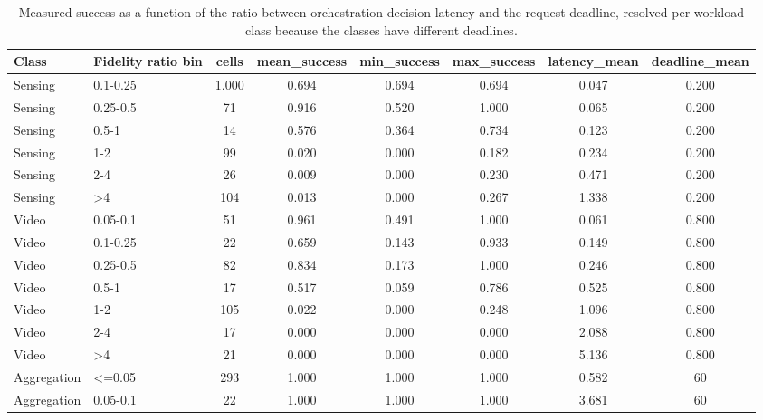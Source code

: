 \begin{table}
\centering
\scriptsize
\caption{Measured success as a function of the ratio between orchestration decision latency and the request deadline, resolved per workload class because the classes have different deadlines.}
\label{tab:p1-temporal-fidelity}
\begin{tabular}{llcccccc}
\toprule
Class & Fidelity ratio bin & cells & mean\_success & min\_success & max\_success & latency\_mean & deadline\_mean \\
\midrule
Sensing & 0.1-0.25 & 1.000 & 0.694 & 0.694 & 0.694 & 0.047 & 0.200 \\
Sensing & 0.25-0.5 & 71 & 0.916 & 0.520 & 1.000 & 0.065 & 0.200 \\
Sensing & 0.5-1 & 14 & 0.576 & 0.364 & 0.734 & 0.123 & 0.200 \\
Sensing & 1-2 & 99 & 0.020 & 0.000 & 0.182 & 0.234 & 0.200 \\
Sensing & 2-4 & 26 & 0.009 & 0.000 & 0.230 & 0.471 & 0.200 \\
Sensing & >4 & 104 & 0.013 & 0.000 & 0.267 & 1.338 & 0.200 \\
Video & 0.05-0.1 & 51 & 0.961 & 0.491 & 1.000 & 0.061 & 0.800 \\
Video & 0.1-0.25 & 22 & 0.659 & 0.143 & 0.933 & 0.149 & 0.800 \\
Video & 0.25-0.5 & 82 & 0.834 & 0.173 & 1.000 & 0.246 & 0.800 \\
Video & 0.5-1 & 17 & 0.517 & 0.059 & 0.786 & 0.525 & 0.800 \\
Video & 1-2 & 105 & 0.022 & 0.000 & 0.248 & 1.096 & 0.800 \\
Video & 2-4 & 17 & 0.000 & 0.000 & 0.000 & 2.088 & 0.800 \\
Video & >4 & 21 & 0.000 & 0.000 & 0.000 & 5.136 & 0.800 \\
Aggregation & <=0.05 & 293 & 1.000 & 1.000 & 1.000 & 0.582 & 60 \\
Aggregation & 0.05-0.1 & 22 & 1.000 & 1.000 & 1.000 & 3.681 & 60 \\
\bottomrule
\end{tabular}
\par\vspace{2pt}{\footnotesize\raggedright This is the calibration curve that replaces the D/10 rule: the ratio at which success stops improving is read from the data rather than asserted.\par}
\end{table}
